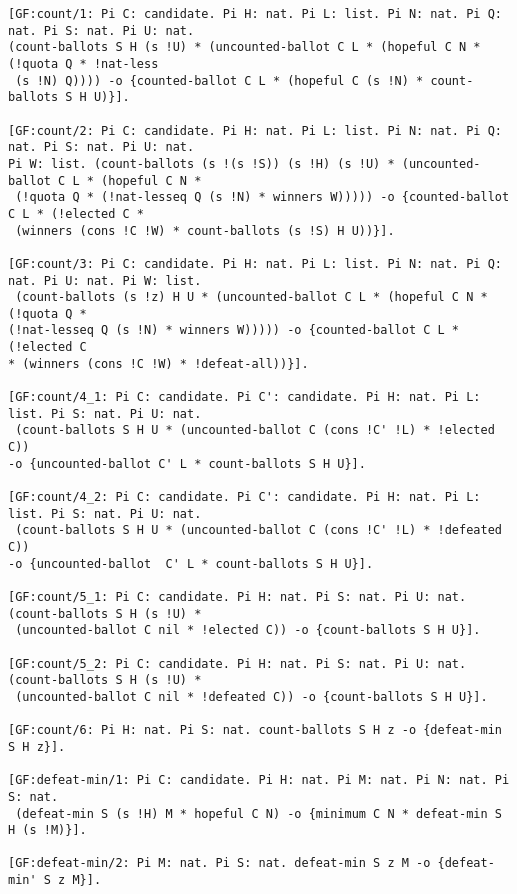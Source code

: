 \begin{lstlisting}[basicstyle=\footnotesize\ttfamily,numbers=none]
[GF:count/1: Pi C: candidate. Pi H: nat. Pi L: list. Pi N: nat. Pi Q: nat. Pi S: nat. Pi U: nat. 
(count-ballots S H (s !U) * (uncounted-ballot C L * (hopeful C N * (!quota Q * !nat-less 
 (s !N) Q)))) -o {counted-ballot C L * (hopeful C (s !N) * count-ballots S H U)}].

[GF:count/2: Pi C: candidate. Pi H: nat. Pi L: list. Pi N: nat. Pi Q: nat. Pi S: nat. Pi U: nat.  
Pi W: list. (count-ballots (s !(s !S)) (s !H) (s !U) * (uncounted-ballot C L * (hopeful C N * 
 (!quota Q * (!nat-lesseq Q (s !N) * winners W))))) -o {counted-ballot C L * (!elected C * 
 (winners (cons !C !W) * count-ballots (s !S) H U))}].

[GF:count/3: Pi C: candidate. Pi H: nat. Pi L: list. Pi N: nat. Pi Q: nat. Pi U: nat. Pi W: list. 
 (count-ballots (s !z) H U * (uncounted-ballot C L * (hopeful C N * (!quota Q *  
(!nat-lesseq Q (s !N) * winners W))))) -o {counted-ballot C L * (!elected C  
* (winners (cons !C !W) * !defeat-all))}].

[GF:count/4_1: Pi C: candidate. Pi C': candidate. Pi H: nat. Pi L: list. Pi S: nat. Pi U: nat. 
 (count-ballots S H U * (uncounted-ballot C (cons !C' !L) * !elected C))  
-o {uncounted-ballot C' L * count-ballots S H U}].

[GF:count/4_2: Pi C: candidate. Pi C': candidate. Pi H: nat. Pi L: list. Pi S: nat. Pi U: nat. 
 (count-ballots S H U * (uncounted-ballot C (cons !C' !L) * !defeated C))  
-o {uncounted-ballot  C' L * count-ballots S H U}].

[GF:count/5_1: Pi C: candidate. Pi H: nat. Pi S: nat. Pi U: nat. (count-ballots S H (s !U) * 
 (uncounted-ballot C nil * !elected C)) -o {count-ballots S H U}].

[GF:count/5_2: Pi C: candidate. Pi H: nat. Pi S: nat. Pi U: nat. (count-ballots S H (s !U) * 
 (uncounted-ballot C nil * !defeated C)) -o {count-ballots S H U}].

[GF:count/6: Pi H: nat. Pi S: nat. count-ballots S H z -o {defeat-min S H z}].

[GF:defeat-min/1: Pi C: candidate. Pi H: nat. Pi M: nat. Pi N: nat. Pi S: nat. 
 (defeat-min S (s !H) M * hopeful C N) -o {minimum C N * defeat-min S H (s !M)}].

[GF:defeat-min/2: Pi M: nat. Pi S: nat. defeat-min S z M -o {defeat-min' S z M}].


\end{lstlisting}
